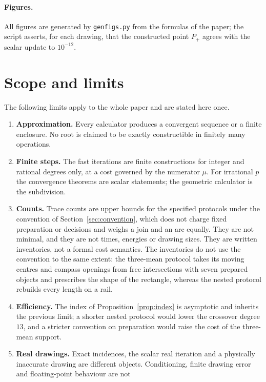 \paragraph{Figures.}
All figures are generated by \texttt{genfigs.py} from the formulas of the paper; the script asserts, for
each drawing, that the constructed point $P_+$ agrees with the scalar update to $10^{-12}$.

\section{Scope and limits}\label{sec:limits}

The following limits apply to the whole paper and are stated here once.
\begin{enumerate}[label=\arabic*.]
\item \textbf{Approximation.} Every calculator produces a convergent sequence or a finite enclosure. No
  root is claimed to be exactly constructible in finitely many operations.
\item \textbf{Finite steps.} The fast iterations are finite constructions for integer and rational
  degrees only, at a cost governed by the numerator $\mu$. For irrational $p$ the convergence theorems
  are scalar statements; the geometric calculator is the subdivision.
\item \textbf{Counts.} Trace counts are upper bounds for the specified protocols under the convention of
  Section~\ref{sec:convention}, which does not charge fixed preparation or decisions and weighs a join
  and an arc equally. They are not minimal, and they are not times, energies or drawing sizes. They are
  written inventories, not a formal cost semantics. The inventories do not use the convention to the
  same extent: the three-mean protocol takes its moving centres and compass openings from free
  intersections with seven prepared objects and prescribes the shape of the rectangle, whereas the
  nested protocol rebuilds every length on a rail.
\item \textbf{Efficiency.} The index of Proposition~\ref{prop:index} is asymptotic and inherits the
  previous limit; a shorter nested protocol would lower the crossover degree $13$, and a stricter
  convention on preparation would raise the cost of the three-mean support.
\item \textbf{Real drawings.} Exact incidences, the scalar real iteration and a physically inaccurate
  drawing are different objects. Conditioning, finite drawing error and floating-point behaviour are not

\end{enumerate}
